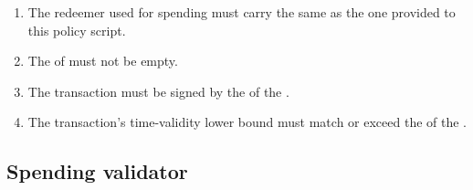 \documentclass[../midgard.tex]{subfiles}
\begin{document}
\begin{description}
\begin{enumerate}
          Let  be this utxo.
        \item The redeemer used for spending  must carry the same  as the one provided to this policy script.
        \item The  of  must not be empty.
        \item The transaction must be signed by the  of the .
        \item The transaction's time-validity lower bound must match or exceed the  of the .
      \end{enumerate}
\end{description}

\subsection{Spending validator}
\label{h:settlement-spending-validator}
\end{document}

